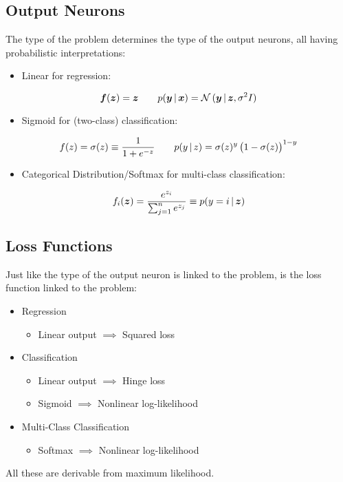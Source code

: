 		\subsection{Output Neurons}
			The type of the problem determines the type of the output neurons, all having probabilistic interpretations:
			\begin{itemize}
				\item Linear for regression:
			\end{itemize}
			\begin{equation}
				\bm{f}(\bm{z}) = \bm{z} \qquad p(\bm{y} \,\vert\, \bm{x}) = \mathcal{N}\,(\bm{y} \,\vert\, \bm{z}, \sigma^2 I)
			\end{equation}
			\begin{itemize}
				\item Sigmoid for (two-class) classification:
			\end{itemize}
			\begin{equation}
				f(z) = \sigma(z) \equiv \frac{1}{1 + e^{-z}} \qquad p(y \,\vert\, z) = \sigma(z)^y \, \big( 1 - \sigma(z) \big)^{1 - y}
			\end{equation}
			\begin{itemize}
				\item Categorical Distribution/Softmax for multi-class classification:
			\end{itemize}
			\begin{equation}
				f_i(\bm{z}) = \frac{e^{z_i}}{\sum_{j = 1}^{n} e^{z_j}} \equiv p(y = i \,\vert\, \bm{z})
			\end{equation}

		\subsection{Loss Functions}
			Just like the type of the output neuron is linked to the problem, is the loss function linked to the problem:
			\begin{itemize}
				\item Regression
					\begin{itemize}
						\item Linear output \(\implies\) Squared loss
					\end{itemize}
				\item Classification
					\begin{itemize}
						\item Linear output \(\implies\) Hinge loss
						\item Sigmoid \(\implies\) Nonlinear log-likelihood
					\end{itemize}
				\item Multi-Class Classification
					\begin{itemize}
						\item Softmax \(\implies\) Nonlinear log-likelihood
					\end{itemize}
			\end{itemize}
			All these are derivable from maximum likelihood.

